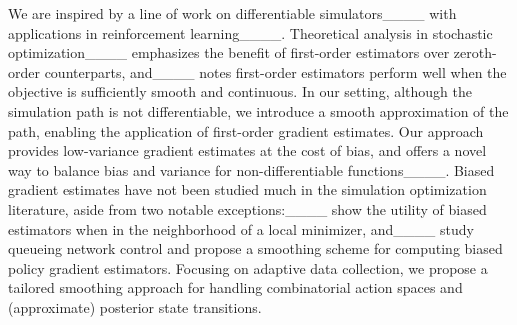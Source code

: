 We are inspired  by a line of work on differentiable 
simulators____ with applications in reinforcement learning____.
Theoretical analysis in stochastic optimization____ emphasizes the benefit of first-order estimators over
zeroth-order counterparts, and____ notes first-order estimators
perform well when the objective is sufficiently smooth and continuous. 
In our setting, although the simulation path is not differentiable, we introduce a smooth approximation of the path, enabling the application of first-order gradient estimates.
Our approach provides low-variance gradient estimates at the cost of bias, and  offers a novel way to balance bias and variance for non-differentiable functions____.
Biased gradient estimates have not been studied much in the simulation optimization literature, 
aside from two notable exceptions:____ show the utility of biased estimators when in the neighborhood of a local minimizer, and____ study queueing network control and propose a smoothing scheme for computing biased policy gradient estimators. Focusing on adaptive data collection, we propose a tailored smoothing approach for  handling combinatorial action spaces and (approximate) posterior state transitions.
